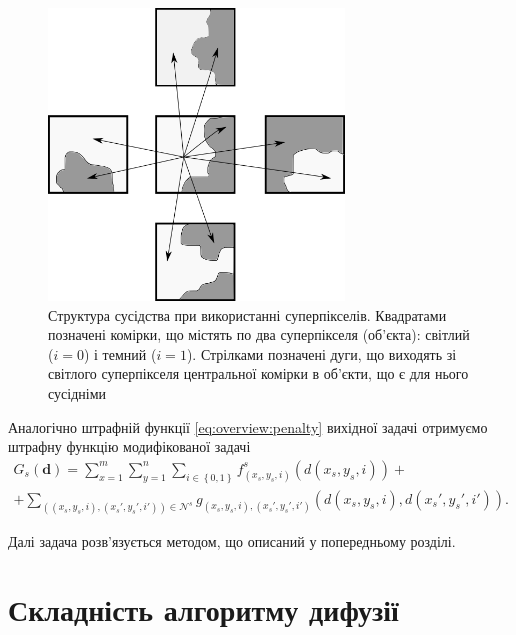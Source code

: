 \begin{figure}[h]
  \centering
  \includegraphics[width=0.7\textwidth]{images/neighbours_superpixel}
  \caption{Структура сусідства при використанні суперпікселів.
           Квадратами позначені комірки,
           що містять по два суперпікселя (об'єкта):
           світлий ($i = 0$) і темний ($i = 1$).
           Стрілками позначені дуги,
           що виходять зі світлого суперпікселя центральної комірки в об'єкти,
           що є для нього сусідніми}
  \label{fig:superpixel:neighbors}
\end{figure}

Аналогічно штрафній функції \eqref{eq:overview:penalty}
вихідної задачі отримуємо штрафну функцію модифікованої задачі
\begin{equation*}
\begin{gathered}
    G_s \left( \pmb{d} \right)
    = \sum \limits_{x = 1}^{m}
        \sum \limits_{y = 1}^{n}
            \sum \limits_{i \in \left\{ 0, 1 \right\}}
                f_{\left( x_s, y_s, i \right)}^s
                    \left( d \left(x_s, y_s, i \right) \right) + \\
    + \sum \limits_{\left( \left(x_s, y_s, i \right), \left(x_s', y_s', i' \right) \right) \in \mathcal{N}^s}
            g_{\left(x_s, y_s, i \right), \left(x_s', y_s', i' \right)} \left(
                d \left( x_s, y_s, i \right), d \left( x_s', y_s', i' \right)
            \right).
\end{gathered}
\end{equation*}

Далі задача розв'язується методом, що описаний у попередньому розділі.

\section{Складність алгоритму дифузії}

